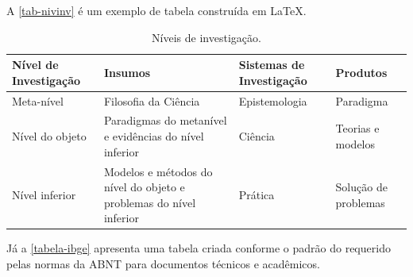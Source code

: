     A \autoref{tab-nivinv} é um exemplo de tabela construída em
    \LaTeX.

    \begin{table}[htb]
    \ABNTEXfontereduzida
    \caption[Níveis de investigação]{Níveis de investigação.}
    \label{tab-nivinv}
    \begin{tabular}{p{2.6cm}|p{6.0cm}|p{2.25cm}|p{3.40cm}}
       \textbf{Nível de Investigação} & \textbf{Insumos}  & \textbf{Sistemas de Investigação}  & \textbf{Produtos}  \\
        \hline
        Meta-nível & Filosofia\index{filosofia} da Ciência  & Epistemologia &
        Paradigma  \\
        \hline
        Nível do objeto & Paradigmas do metanível e evidências do nível inferior &
        Ciência  & Teorias e modelos \\
        \hline
        Nível inferior & Modelos e métodos do nível do objeto e problemas do nível inferior & Prática & Solução de problemas  \\
    \end{tabular}
    \end{table}

    Já a \autoref{tabela-ibge} apresenta uma tabela criada conforme o padrão do
     requerido pelas normas da ABNT para documentos técnicos e
    acadêmicos.

    \begin{table}[htb]
    \end{table}


